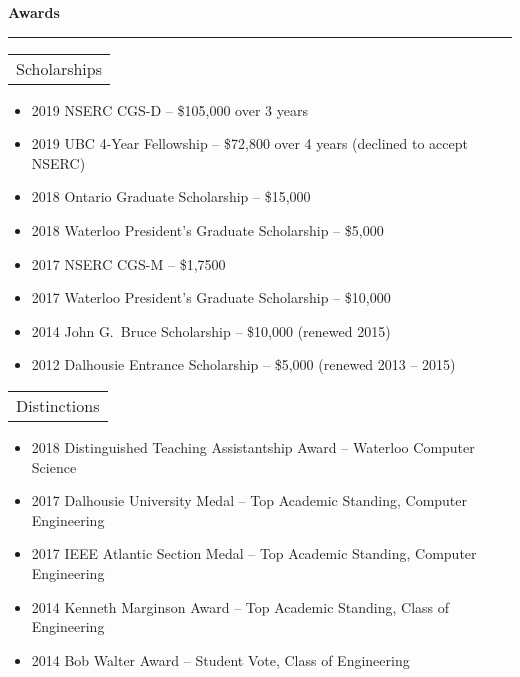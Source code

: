 \documentclass{article}
\newcommand{\heading}[1]
{
	\vspace{3pt}
	\textbf{#1} 
	\vspace{-6pt}
	
	\rule{\linewidth}{0.4pt}
}
\begin{document}
\heading{Awards}
\begin{tabularx}{\textwidth}{X}
    Scholarships \\
\end{tabularx}
\begin{itemize}
\item 2019 NSERC CGS-D -- \$105,000 over 3 years
\item 2019 UBC 4-Year Fellowship -- \$72,800 over 4 years (declined to accept NSERC)
\item 2018 Ontario Graduate Scholarship -- \$15,000
\item 2018 Waterloo President's Graduate Scholarship -- \$5,000
\item 2017 NSERC CGS-M -- \$1,7500
\item 2017 Waterloo President's Graduate Scholarship -- \$10,000
\item 2014 John G.~Bruce Scholarship -- \$10,000 (renewed 2015)
\item 2012 Dalhousie Entrance Scholarship -- \$5,000 (renewed 2013 -- 2015)
\end{itemize}
\begin{tabularx}{\textwidth}{X}
    Distinctions \\
\end{tabularx}
\begin{itemize}
\item 2018 Distinguished Teaching Assistantship Award -- Waterloo Computer Science
\item 2017 Dalhousie University Medal -- Top Academic Standing, Computer Engineering
\item 2017 IEEE Atlantic Section Medal -- Top Academic Standing, Computer Engineering
\item 2014 Kenneth Marginson Award -- Top Academic Standing, Class of Engineering
\item 2014 Bob Walter Award -- Student Vote, Class of Engineering 
\end{itemize}

\clearpage
\end{document}
